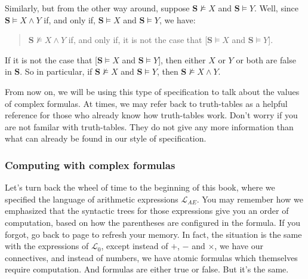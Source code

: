 Similarly, but from the other way around, suppose $\mathbf{S} \not\models X$ and $\mathbf{S} \models Y$. Well, since $\mathbf{S} \models X \wedge Y$ if, and only if, $\mathbf{S} \models X$ and $\mathbf{S} \models Y$, we have:

\begin{quote}
	$\mathbf{S} \not\models X \wedge Y$ if, and only if, it is not the case that [$\mathbf{S} \models X$ and $\mathbf{S} \models Y$]. 
\end{quote}

If it is not the case that [$\mathbf{S} \models X$ and $\mathbf{S} \models Y$], then either $X$ or $Y$ or both are false in $\mathbf{S}$. So in particular, if $\mathbf{S} \not\models X$ and $\mathbf{S} \models Y$, then $\mathbf{S} \not\models X \wedge Y$. 


From now on, we will be using this type of specification to talk about the values of complex formulas. At times, we may refer back to truth-tables as a helpful reference for those who already know how truth-tables work. Don't worry if you are not familar with truth-tables. They do not give any more information than what can already be found in our style of specification. 

\subsubsection{Computing with complex formulas}

Let's turn back the wheel of time to the beginning of this book, where we specified the language of arithmetic expressions $\mathcal{L}_{AE}$. You may remember how we emphasized that the syntactic trees for those expressions give you an order of computation, based on how the parentheses are configured in the formula. If you forgot, go back to page \pageref{syntrcom} to refresh your memory. In fact, the situation is the same with the expressions of $\mathcal{L}_0$, except instead of $+$, $-$ and $\times$, we have our connectives, and instead of numbers, we have atomic formulas which themselves require computation. And formulas are either true or false. But it's the same. 

